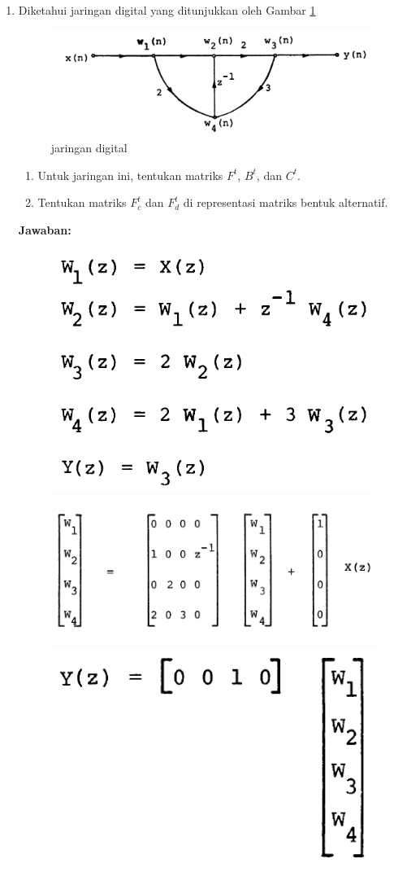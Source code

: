 \documentclass[12pt,a4paper]{article}
\begin{document}
\begin{enumerate}
\begin{enumerate}
		\end{enumerate}
		\item Diketahui jaringan digital yang ditunjukkan oleh Gambar \ref{fig:img04}
		
		\begin{figure}[H]
			\centering
			\includegraphics[width=0.5\linewidth]{img/img04}
			\caption{jaringan digital}
			\label{fig:img04}
		\end{figure}
		
		\begin{enumerate}
			\item Untuk jaringan ini, tentukan matriks $ F^t $, $ B^t $, dan $ C^t $.
			\item Tentukan matriks $ F_c^t $ dan $ F_d^t $ di representasi matriks bentuk alternatif.\\
		\end{enumerate}
		\textbf{Jawaban:}
		
		\begin{figure}[H]
			\centering
			\includegraphics[width=0.3\linewidth]{img/img05}
		\end{figure}
		
		\begin{figure}[H]
			\centering
			\includegraphics[width=0.5\linewidth]{img/img06}
		\end{figure}
		
		\begin{figure}[H]
			\centering
			\includegraphics[width=0.3\linewidth]{img/img07}
		\end{figure}
		

\end{enumerate}
\end{document}
